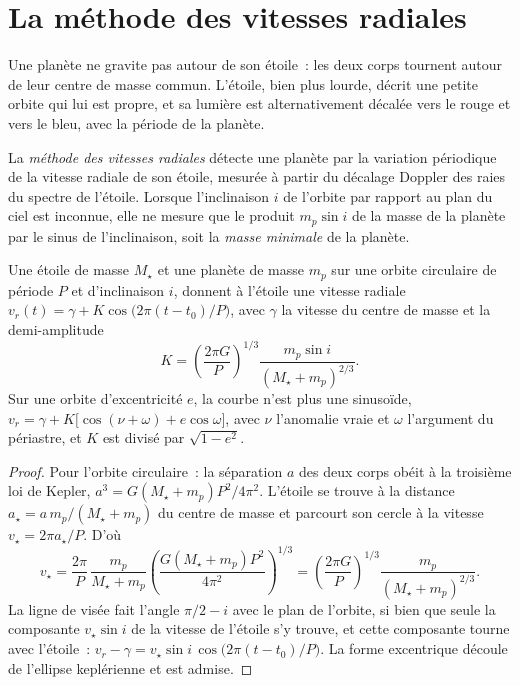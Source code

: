 \section{La méthode des vitesses radiales}\label{sec:b3:exoplanets:rv}

Une planète ne gravite pas autour de son étoile~: les deux corps tournent autour de leur centre de masse commun.
L'étoile, bien plus lourde, décrit une petite orbite qui lui est propre, et sa lumière
est alternativement décalée vers le rouge et vers le bleu, avec la période de la planète.

\begin{definition}\label{def:b3:exoplanets:rv}
La \emph{méthode des vitesses radiales} détecte une
planète par la variation périodique de la vitesse radiale de son étoile,
mesurée à partir du décalage Doppler des raies du spectre de l'étoile. Lorsque
l'inclinaison $i$ de l'orbite par rapport au plan du ciel est inconnue, elle
ne mesure que le produit $m_p\sin i$ de la masse de la planète par le sinus de
l'inclinaison, soit la \emph{masse minimale} de la
planète.
\end{definition}

\begin{theorem}\label{thm:b3:exoplanets:semi-amplitude}
Une étoile de masse $M_\star$ et une planète de masse $m_p$ sur une orbite circulaire de
période $P$ et d'inclinaison $i$, donnent à l'étoile une vitesse radiale
$v_r(t) = \gamma + K\cos\bigl(2\pi(t - t_0)/P\bigr)$, avec $\gamma$ la
vitesse du centre de masse et la demi-amplitude
\[
K = \left(\frac{2\pi G}{P}\right)^{1/3}
    \frac{m_p\sin i}{(M_\star + m_p)^{2/3}} .
\]
Sur une orbite d'excentricité $e$, la courbe n'est plus une sinusoïde,
$v_r = \gamma + K\bigl[\cos(\nu + \omega) + e\cos\omega\bigr]$, avec $\nu$
l'anomalie vraie et $\omega$ l'argument du périastre, et $K$ est
divisé par $\sqrt{1 - e^2}$.
\end{theorem}

\begin{proof}
Pour l'orbite circulaire~: la séparation $a$ des deux corps obéit
à la troisième loi de Kepler, $a^3 = G(M_\star + m_p)P^2/4\pi^2$. L'étoile se trouve à
la distance $a_\star = a\,m_p/(M_\star + m_p)$ du centre de masse
et parcourt son cercle à la vitesse $v_\star = 2\pi a_\star/P$. D'où
\[
v_\star = \frac{2\pi}{P}\,\frac{m_p}{M_\star + m_p}
          \left(\frac{G(M_\star + m_p)P^2}{4\pi^2}\right)^{1/3}
        = \left(\frac{2\pi G}{P}\right)^{1/3}\frac{m_p}{(M_\star + m_p)^{2/3}} .
\]
La ligne de visée fait l'angle $\pi/2 - i$ avec le plan de
l'orbite, si bien que seule la composante $v_\star\sin i$ de la vitesse de l'étoile s'y trouve, et
cette composante tourne avec l'étoile~: $v_r - \gamma = v_\star\sin i\,
\cos\bigl(2\pi(t - t_0)/P\bigr)$. La forme excentrique découle de
l'ellipse keplérienne et est admise.
\end{proof}

